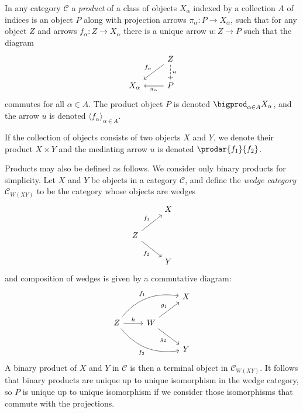 \documentclass[article, a4paper, 11pt, oneside]{memoir}
\numberwithin{equation}{chapter}
\newcommand{\cat}[1]{\mathcal{#1}}
\newcommand{\catC}{\cat{C}}
\theoremstyle{myexample}
\theoremstyle{myexamplebreak}
\begin{document}
\begin{definition}[Products]
    In any category $\catC$ a \emph{product} of a class of objects $X_\alpha$ indexed by a collection $A$ of indices is an object $P$ along with projection arrows $\pi_\alpha \colon P \to X_\alpha$, such that for any object $Z$ and arrows $f_\alpha \colon Z \to X_\alpha$ there is a unique arrow $u \colon Z \to P$ such that the diagram
    \begin{equation*}
        \begin{tikzcd}
            & Z
                \ar[dl, "f_\alpha", swap]
                \ar[d, "u", dashed]
            \\
            X_\alpha
            & P
                \ar[l, "\pi_\alpha"]
        \end{tikzcd}
    \end{equation*}
    commutes for all $\alpha \in A$. The product object $P$ is denoted $\bigprod_{\alpha \in A} X_\alpha$, and the arrow $u$ is denoted $\langle f_\alpha \rangle_{\alpha \in A}$.

    If the collection of objects consists of two objects $X$ and $Y$, we denote their product $X \times Y$ and the mediating arrow $u$ is denoted $\prodar{f_1}{f_2}$.
\end{definition}
%
Products may also be defined as follows. We consider only binary products for simplicity. Let $X$ and $Y$ be objects in a category $\catC$, and define the \emph{wedge category} $\catC_{W(XY)}$ to be the category whose objects are wedges
%
\begin{equation*}
    \begin{tikzcd}
        & X
        \\
        Z
            \ar[ur, "f_1"]
            \ar[dr, "f_2", swap]
        \\
        & Y
    \end{tikzcd}
\end{equation*}
%
and composition of wedges is given by a commutative diagram:
%
\begin{equation*}
    \begin{tikzcd}
        && X
        \\
        Z
            \ar[urr, "f_1", bend left]
            \ar[drr, "f_2", bend right, swap]
            \ar[r, "h"]
        & W
            \ar[ur, "g_1"]
            \ar[dr, "g_2", swap]
        \\
        && Y
    \end{tikzcd}
\end{equation*}
%
A binary product of $X$ and $Y$ in $\catC$ is then a terminal object in $\catC_{W(XY)}$. It follows that binary products are unique up to unique isomorphism in the wedge category, so $P$ is unique up to unique isomorphism if we consider those isomorphisms that commute with the projections.
\end{document}
